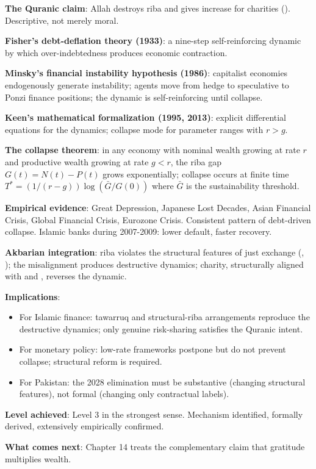 \begin{summarybox}
\textbf{The Quranic claim}: Allah destroys riba and gives increase
for charities (). Descriptive, not merely moral.

\textbf{Fisher's debt-deflation theory (1933)}: a nine-step
self-reinforcing dynamic by which over-indebtedness produces
economic contraction.

\textbf{Minsky's financial instability hypothesis (1986)}:
capitalist economies endogenously generate instability; agents
move from hedge to speculative to Ponzi finance positions; the
dynamic is self-reinforcing until collapse.

\textbf{Keen's mathematical formalization (1995, 2013)}: explicit
differential equations for the dynamics; collapse mode for
parameter ranges with $r > g$.

\textbf{The collapse theorem}: in any economy with nominal wealth
growing at rate $r$ and productive wealth growing at rate $g < r$,
the riba gap $G(t) = N(t) - P(t)$ grows exponentially; collapse
occurs at finite time $T^* = (1/(r-g)) \log(\bar{G}/G(0))$ where
$\bar{G}$ is the sustainability threshold.

\textbf{Empirical evidence}: Great Depression, Japanese Lost
Decades, Asian Financial Crisis, Global Financial Crisis,
Eurozone Crisis. Consistent pattern of debt-driven collapse.
Islamic banks during 2007-2009: lower default, faster recovery.

\textbf{Akbarian integration}: riba violates the structural
features of just exchange (, ); the
misalignment produces destructive dynamics; charity, structurally
aligned with  and , reverses the
dynamic.

\textbf{Implications}:
\begin{itemize}[leftmargin=1.5em]
    \item For Islamic finance: tawarruq and structural-riba
    arrangements reproduce the destructive dynamics; only genuine
    risk-sharing satisfies the Quranic intent.
    \item For monetary policy: low-rate frameworks postpone but
    do not prevent collapse; structural reform is required.
    \item For Pakistan: the 2028 elimination must be substantive
    (changing structural features), not formal (changing only
    contractual labels).
\end{itemize}

\textbf{Level achieved}: Level 3 in the strongest sense.
Mechanism identified, formally derived, extensively empirically
confirmed.

\textbf{What comes next}: Chapter 14 treats the complementary
claim that gratitude multiplies wealth.
\end{summarybox}

\cleardoublepage
